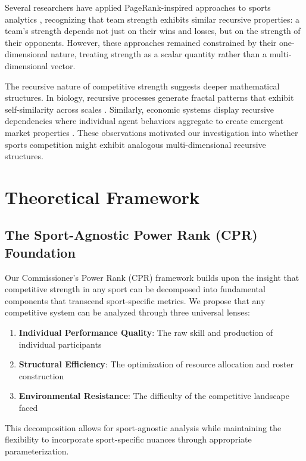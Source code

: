\documentclass[11pt]{article}
\begin{document}
Several researchers have applied PageRank-inspired approaches to sports analytics \cite{keener1993pagerank, massey1997statistical}, recognizing that team strength exhibits similar recursive properties: a team's strength depends not just on their wins and losses, but on the strength of their opponents. However, these approaches remained constrained by their one-dimensional nature, treating strength as a scalar quantity rather than a multi-dimensional vector.

The recursive nature of competitive strength suggests deeper mathematical structures. In biology, recursive processes generate fractal patterns that exhibit self-similarity across scales \cite{mandelbrot1982fractal}. Similarly, economic systems display recursive dependencies where individual agent behaviors aggregate to create emergent market properties \cite{arthur1999complexity}. These observations motivated our investigation into whether sports competition might exhibit analogous multi-dimensional recursive structures.

\section{Theoretical Framework}

\subsection{The Sport-Agnostic Power Rank (CPR) Foundation}

Our Commissioner's Power Rank (CPR) framework builds upon the insight that competitive strength in any sport can be decomposed into fundamental components that transcend sport-specific metrics. We propose that any competitive system can be analyzed through three universal lenses:

\begin{enumerate}
    \item \textbf{Individual Performance Quality}: The raw skill and production of individual participants
    \item \textbf{Structural Efficiency}: The optimization of resource allocation and roster construction
    \item \textbf{Environmental Resistance}: The difficulty of the competitive landscape faced
\end{enumerate}

This decomposition allows for sport-agnostic analysis while maintaining the flexibility to incorporate sport-specific nuances through appropriate parameterization.
\end{document}
